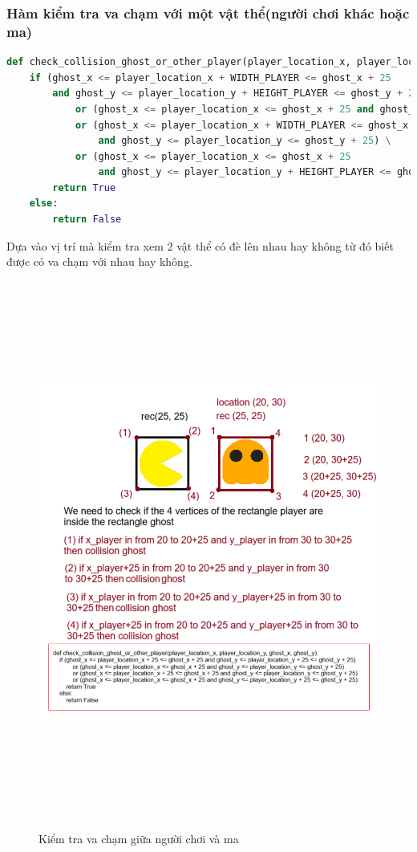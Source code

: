 \documentclass[a4paper]{article}
\begin{document}
\subsubsection{Hàm kiểm tra va chạm với một vật thể(người chơi khác hoặc ma)}
\begin{lstlisting}[language=Python]
def check_collision_ghost_or_other_player(player_location_x, player_location_y, ghost_x, ghost_y):
    if (ghost_x <= player_location_x + WIDTH_PLAYER <= ghost_x + 25
        and ghost_y <= player_location_y + HEIGHT_PLAYER <= ghost_y + 25) \
            or (ghost_x <= player_location_x <= ghost_x + 25 and ghost_y <= player_location_y <= ghost_y + 25) \
            or (ghost_x <= player_location_x + WIDTH_PLAYER <= ghost_x + 25
                and ghost_y <= player_location_y <= ghost_y + 25) \
            or (ghost_x <= player_location_x <= ghost_x + 25
                and ghost_y <= player_location_y + HEIGHT_PLAYER <= ghost_y + 25):
        return True
    else:
        return False

\end{lstlisting}
Dựa vào vị trí mà kiểm tra xem 2 vật thể có đè lên nhau hay không từ đó biết được có va chạm với nhau hay không.

\newpage
\begin{figure}[h!]
    \centering
    \includegraphics[width=15cm, height=18cm]{collision_ghost.png}
    \caption{Kiểm tra va chạm giữa người chơi và ma}
\end{figure}
\end{document}
